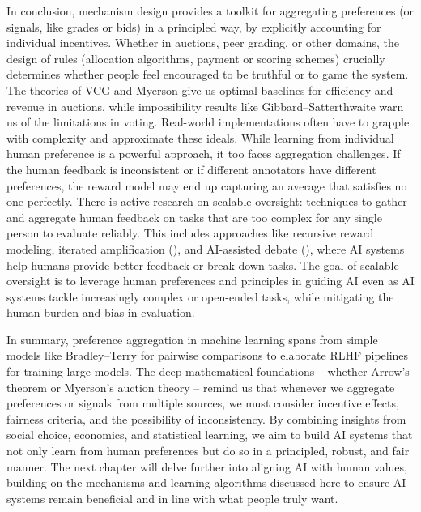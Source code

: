 \documentclass[
  letterpaper,
  numbers=noenddot,
  DIV=11]{scrreprt}
\theoremstyle{definition}
\theoremstyle{plain}
\theoremstyle{plain}
\theoremstyle{remark}
\begin{document}
In conclusion, mechanism design provides a toolkit for aggregating
preferences (or signals, like grades or bids) in a principled way, by
explicitly accounting for individual incentives. Whether in auctions,
peer grading, or other domains, the design of rules (allocation
algorithms, payment or scoring schemes) crucially determines whether
people feel encouraged to be truthful or to game the system. The
theories of VCG and Myerson give us optimal baselines for efficiency and
revenue in auctions, while impossibility results like
Gibbard--Satterthwaite warn us of the limitations in voting. Real-world
implementations often have to grapple with complexity and approximate
these ideals. While learning from individual human preference is a
powerful approach, it too faces aggregation challenges. If the human
feedback is inconsistent or if different annotators have different
preferences, the reward model may end up capturing an average that
satisfies no one perfectly. There is active research on scalable
oversight: techniques to gather and aggregate human feedback on tasks
that are too complex for any single person to evaluate reliably. This
includes approaches like recursive reward modeling, iterated
amplification
(),
and AI-assisted debate
(), where AI systems
help humans provide better feedback or break down tasks. The goal of
scalable oversight is to leverage human preferences and principles in
guiding AI even as AI systems tackle increasingly complex or open-ended
tasks, while mitigating the human burden and bias in evaluation.

In summary, preference aggregation in machine learning spans from simple
models like Bradley--Terry for pairwise comparisons to elaborate RLHF
pipelines for training large models. The deep mathematical foundations
-- whether Arrow's theorem or Myerson's auction theory -- remind us that
whenever we aggregate preferences or signals from multiple sources, we
must consider incentive effects, fairness criteria, and the possibility
of inconsistency. By combining insights from social choice, economics,
and statistical learning, we aim to build AI systems that not only learn
from human preferences but do so in a principled, robust, and fair
manner. The next chapter will delve further into aligning AI with human
values, building on the mechanisms and learning algorithms discussed
here to ensure AI systems remain beneficial and in line with what people
truly want.
\end{document}
